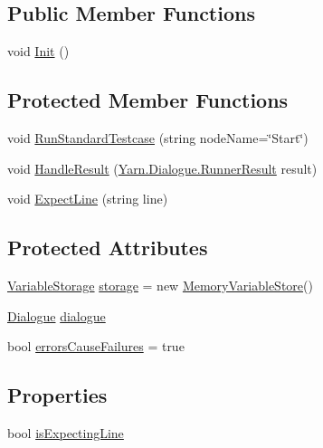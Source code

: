 \subsection*{Public Member Functions}
\begin{DoxyCompactItemize}
\item 
void \hyperlink{a00144_a357a0dab579f9e45666c10779683dc27}{Init} ()
\end{DoxyCompactItemize}
\subsection*{Protected Member Functions}
\begin{DoxyCompactItemize}
\item 
void \hyperlink{a00144_abffa134d40d72b21e6b35c3bf05fc53f}{Run\-Standard\-Testcase} (string node\-Name=\char`\"{}Start\char`\"{})
\item 
void \hyperlink{a00144_a7b525f85a26d7c942e1cbfa5d6453893}{Handle\-Result} (\hyperlink{a00130}{Yarn.\-Dialogue.\-Runner\-Result} result)
\item 
void \hyperlink{a00144_ac21a5082ddac1da9db17ae54038df44e}{Expect\-Line} (string line)
\end{DoxyCompactItemize}
\subsection*{Protected Attributes}
\begin{DoxyCompactItemize}
\item 
\hyperlink{a00164}{Variable\-Storage} \hyperlink{a00144_a23d59ace1516ca72924c6fe3feafd3f7}{storage} = new \hyperlink{a00108}{Memory\-Variable\-Store}()
\item 
\hyperlink{a00070}{Dialogue} \hyperlink{a00144_a4cff5de56c4b8a91c76b6eb2d622a795}{dialogue}
\item 
bool \hyperlink{a00144_ac978fe85db843c51411f5517bdbe0eb8}{errors\-Cause\-Failures} = true
\end{DoxyCompactItemize}
\subsection*{Properties}
\begin{DoxyCompactItemize}
\item 
bool \hyperlink{a00144_a47f35b8e8123ed9471883d02b8bc9f3e}{is\-Expecting\-Line}
\end{DoxyCompactItemize}

